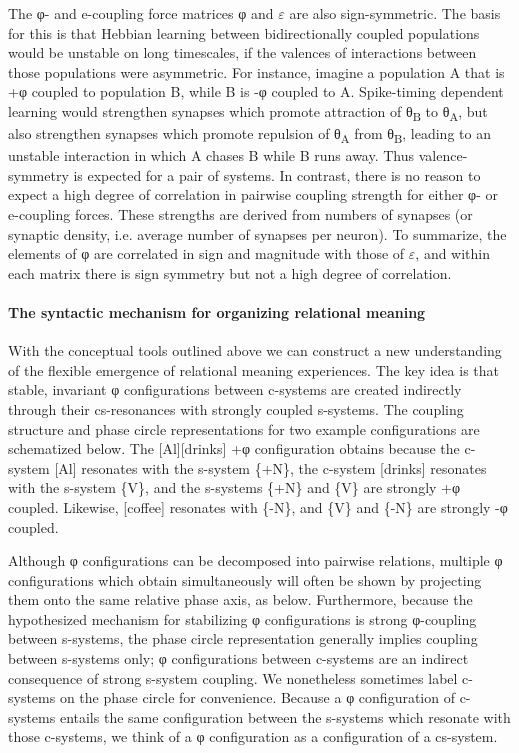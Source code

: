   The φ- and e-coupling force matrices φ and $\varepsilon $ are also sign-symmetric. The basis for this is that Hebbian learning between bidirectionally coupled populations would be unstable on long timescales, if the valences of interactions between those populations were asymmetric. For instance, imagine a population A that is +φ coupled to population B, while B is -φ coupled to A. Spike-timing dependent learning would strengthen synapses which promote attraction of θ\textsubscript{B} to θ\textsubscript{A}, but also strengthen synapses which promote repulsion of θ\textsubscript{A} from θ\textsubscript{B}, leading to an unstable interaction in which A chases B while B runs away. Thus valence-symmetry is expected for a pair of systems. In contrast, there is no reason to expect a high degree of correlation in pairwise coupling strength for either φ- or e-coupling forces. These strengths are derived from numbers of synapses (or synaptic density, i.e. average number of synapses per neuron). To summarize, the elements of φ are correlated in sign and magnitude with those of $\varepsilon $, and within each matrix there is sign symmetry but not a high degree of correlation.

\paragraph{The syntactic mechanism for organizing relational meaning}

With the conceptual tools outlined above we can construct a new understanding of the flexible emergence of relational meaning experiences. The key idea is that stable, invariant φ configurations between c-systems are created indirectly through their cs-resonances with strongly coupled s-systems. The coupling structure and phase circle representations for two example configurations are schematized below. The [Al][drinks] +φ configuration obtains because the c-system [Al] resonates with the s-system \{+N\}, the c-system [drinks] resonates with the s-system \{V\}, and the s-systems \{+N\} and \{V\} are strongly +φ coupled. Likewise, [coffee] resonates with \{-N\}, and \{V\} and \{-N\} are strongly -φ coupled.

  Although φ configurations can be decomposed into pairwise relations, multiple φ configurations which obtain simultaneously will often be shown by projecting them onto the same relative phase axis, as below. Furthermore, because the hypothesized mechanism for stabilizing φ configurations is strong φ-coupling between s-systems, the phase circle representation generally implies coupling between s-systems only; φ configurations between c-systems are an indirect consequence of strong s-system coupling. We nonetheless sometimes label c-systems on the phase circle for convenience. Because a φ configuration of c-systems entails the same configuration between the s-systems which resonate with those c-systems, we think of a φ configuration as a configuration of a cs-system. 


